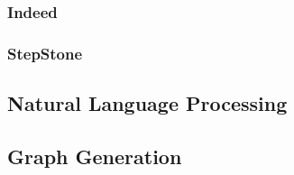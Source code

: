\documentclass[runningheads]{llncs}
\begin{document}
\subsubsection{Indeed}
\label{subsub:indeed}

\subsubsection{StepStone}
\label{subsub:stepstone}




\subsection{Natural Language Processing}
\label{sub:natural_language_processing}


\subsection{Graph Generation}
\label{sub:graph_generation}
\end{document}
